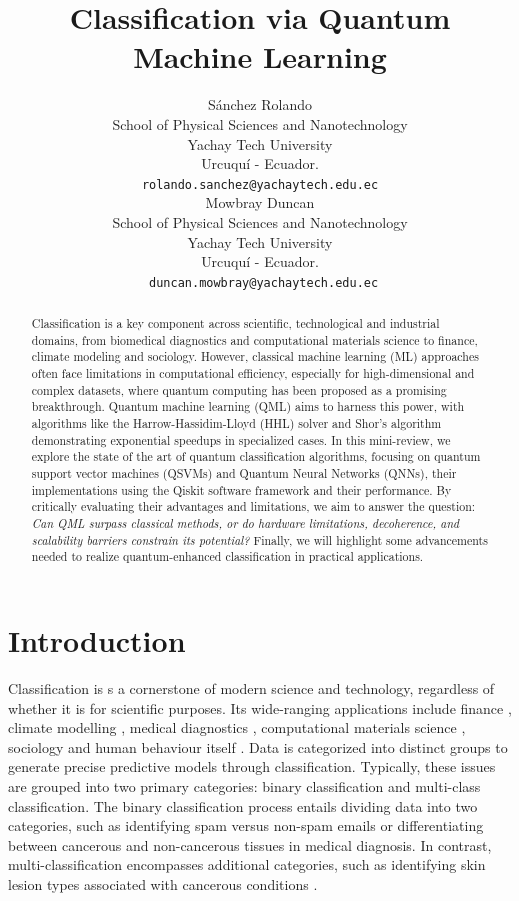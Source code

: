 \documentclass{article}
\title{Classification via Quantum Machine Learning} %
\author{
 Sánchez Rolando \\
 School of Physical Sciences and Nanotechnology\\
 Yachay Tech University\\
 Urcuquí - Ecuador. \\
 \texttt{rolando.sanchez@yachaytech.edu.ec} \\
 \And
 Mowbray Duncan \\
 School of Physical Sciences and Nanotechnology\\
 Yachay Tech University\\
 Urcuquí - Ecuador. \\
 \texttt{	duncan.mowbray@yachaytech.edu.ec} \\
}
\begin{document}
\maketitle
\begin{abstract}
Classification is a key component across scientific, technological and industrial domains, from biomedical diagnostics and computational materials science to finance, climate modeling and sociology. However, classical machine learning (ML) approaches often face limitations in computational efficiency, especially for high-dimensional and complex datasets, where quantum computing has been proposed as a promising breakthrough.  Quantum machine learning (QML) aims to harness this power, with algorithms like the Harrow-Hassidim-Lloyd (HHL) solver and Shor's algorithm demonstrating exponential speedups in specialized cases. 
In this mini-review, we explore the state of the art of quantum classification algorithms, focusing on quantum support vector machines (QSVMs) and Quantum Neural Networks (QNNs), 
their implementations using the Qiskit software framework and their performance. By critically evaluating their advantages and limitations, we aim to answer the question:
\textit{Can QML surpass classical methods, or do hardware limitations, decoherence, and scalability barriers constrain its potential?} 
Finally, we will highlight some advancements needed to realize quantum-enhanced classification in practical applications.
\end{abstract}


\section{Introduction}
Classification is s a cornerstone of modern science and technology, regardless of whether it is for scientific purposes. Its wide-ranging applications include finance \cite{SMAILOVIC2014181}, climate modelling \cite{gmd-16-6433-2023}, medical diagnostics \cite{doi:10.1148/rg.2017160130}, computational materials science \cite{LIU2017159}, sociology \cite{Franco2021} and human behaviour itself \cite{Richards2019}. Data is categorized into distinct groups to generate precise predictive models through classification. 
Typically, these issues are grouped into two primary categories: binary classification and multi-class classification. The binary classification process entails dividing data into two categories, such as identifying spam versus non-spam emails or differentiating between 
cancerous and non-cancerous tissues in medical diagnosis. In contrast, multi-classification encompasses additional categories, such as identifying skin lesion types associated with cancerous conditions \cite{10613907}.
\end{document}
